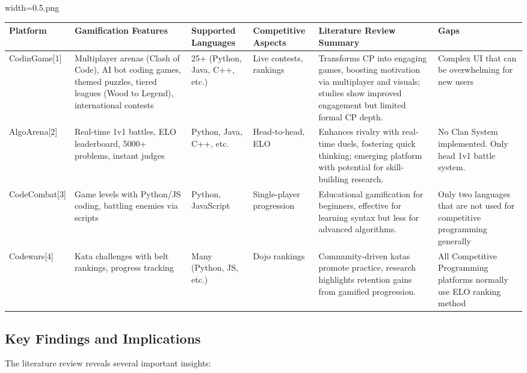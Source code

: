 width=0.5\linewidthimage.png\documentclass[12pt,a4paper]{article}
\begin{document}
\begin{longtable}{|p{2cm}|p{2.5cm}|p{2cm}|p{2cm}|p{3cm}|p{2.5cm}|}
\hline
\textbf{Platform} & \textbf{Gamification Features} & \textbf{Supported Languages} & \textbf{Competitive Aspects} & \textbf{Literature Review Summary} & \textbf{Gaps} \\
\hline
\endhead

CodinGame[1] & Multiplayer arenas (Clash of Code), AI bot coding games, themed puzzles, tiered leagues (Wood to Legend), international contests & 25+ (Python, Java, C++, etc.) & Live contests, rankings & Transforms CP into engaging games, boosting motivation via multiplayer and visuals; studies show improved engagement but limited formal CP depth. & Complex UI that can be overwhelming for new users \\
\hline

AlgoArena[2] & Real-time 1v1 battles, ELO leaderboard, 5000+ problems, instant judges & Python, Java, C++, etc. & Head-to-head, ELO & Enhances rivalry with real-time duels, fostering quick thinking; emerging platform with potential for skill-building research. & No Clan System implemented. Only head 1v1 battle system. \\
\hline

CodeCombat[3] & Game levels with Python/JS coding, battling enemies via scripts & Python, JavaScript & Single-player progression & Educational gamification for beginners, effective for learning syntax but less for advanced algorithms. & Only two languages that are not used for competitive programming generally \\
\hline

Codewars[4] & Kata challenges with belt rankings, progress tracking & Many (Python, JS, etc.) & Dojo rankings & Community-driven katas promote practice, research highlights retention gains from gamified progression. & All Competitive Programming platforms normally use ELO ranking method \\
\hline

\end{longtable}

\subsection{Key Findings and Implications}

The literature review reveals several important insights:
\end{document}
